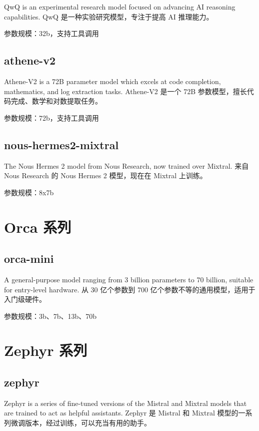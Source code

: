 \documentclass[12pt,UTF8]{ctexbook}
\begin{document}
QwQ is an experimental research model focused on advancing AI reasoning capabilities.
QwQ 是一种实验研究模型，专注于提高 AI 推理能力。

参数规模：32b，支持工具调用

\subsection{athene-v2}

Athene-V2 is a 72B parameter model which excels at code completion, mathematics, and log extraction tasks.
Athene-V2 是一个 72B 参数模型，擅长代码完成、数学和对数提取任务。

参数规模：72b，支持工具调用

\subsection{nous-hermes2-mixtral}

The Nous Hermes 2 model from Nous Research, now trained over Mixtral.
来自 Nous Research 的 Nous Hermes 2 模型，现在在 Mixtral 上训练。

参数规模：8x7b

\section{Orca 系列}

\subsection{orca-mini}

A general-purpose model ranging from 3 billion parameters to 70 billion, suitable for entry-level hardware.
从 30 亿个参数到 700 亿个参数不等的通用模型，适用于入门级硬件。

参数规模：3b、7b、13b、70b

\section{Zephyr 系列}

\subsection{zephyr}

Zephyr is a series of fine-tuned versions of the Mistral and Mixtral models that are trained to act as helpful assistants.
Zephyr 是 Mistral 和 Mixtral 模型的一系列微调版本，经过训练，可以充当有用的助手。
\end{document}
